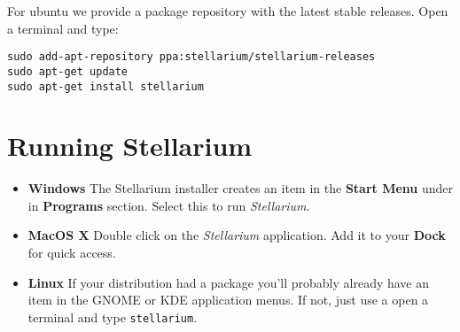 For ubuntu we provide a package repository with the latest stable
releases. Open a terminal and type:

\texttt{sudo~add-apt-repository~ppa:stellarium/stellarium-releases}\\
\texttt{sudo~apt-get~update}\\
\texttt{sudo~apt-get~install~stellarium}

\section{Running Stellarium}\label{running-stellarium}

\begin{itemize}
\item
  \textbf{Windows} The Stellarium installer creates an item in the
  \textbf{Start Menu} under in \textbf{Programs} section. Select this to
  run \emph{Stellarium}.
\item
  \textbf{MacOS X} Double click on the \emph{Stellarium} application.
  Add it to your \textbf{Dock} for quick access.
\item
  \textbf{Linux} If your distribution had a package you'll probably
  already have an item in the GNOME or KDE application menus. If not,
  just use a open a terminal and type \texttt{stellarium}.
\end{itemize}